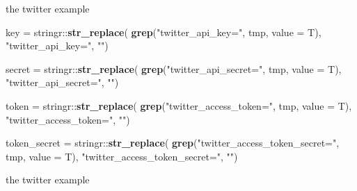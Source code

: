 \documentclass[ignorenonframetext,]{beamer}
\newenvironment{Shaded}{\begin{snugshade}}{\end{snugshade}}
\newcommand{\KeywordTok}[1]{\textcolor[rgb]{0.13,0.29,0.53}{\textbf{{#1}}}}
\newcommand{\DataTypeTok}[1]{\textcolor[rgb]{0.13,0.29,0.53}{{#1}}}
\newcommand{\FloatTok}[1]{\textcolor[rgb]{0.00,0.00,0.81}{{#1}}}
\newcommand{\StringTok}[1]{\textcolor[rgb]{0.31,0.60,0.02}{{#1}}}
\newcommand{\OtherTok}[1]{\textcolor[rgb]{0.56,0.35,0.01}{{#1}}}
\newcommand{\NormalTok}[1]{{#1}}
\begin{document}
\begin{frame}[fragile]{the twitter example}

\begin{Shaded}
\begin{Highlighting}[]
\NormalTok{key =}\StringTok{ }\NormalTok{stringr::}\KeywordTok{str_replace}\NormalTok{(}
  \KeywordTok{grep}\NormalTok{(}\StringTok{"twitter_api_key="}\NormalTok{, tmp, }\DataTypeTok{value =} \NormalTok{T), }
  \StringTok{"twitter_api_key="}\NormalTok{, }\StringTok{""}\NormalTok{)}

\NormalTok{secret =}\StringTok{ }\NormalTok{stringr::}\KeywordTok{str_replace}\NormalTok{(}
  \KeywordTok{grep}\NormalTok{(}\StringTok{"twitter_api_secret="}\NormalTok{, tmp, }\DataTypeTok{value =} \NormalTok{T), }
  \StringTok{"twitter_api_secret="}\NormalTok{, }\StringTok{""}\NormalTok{)}

\NormalTok{token =}\StringTok{ }\NormalTok{stringr::}\KeywordTok{str_replace}\NormalTok{(}
  \KeywordTok{grep}\NormalTok{(}\StringTok{"twitter_access_token="}\NormalTok{, tmp, }\DataTypeTok{value =} \NormalTok{T), }
  \StringTok{"twitter_access_token="}\NormalTok{, }\StringTok{""}\NormalTok{)}

\NormalTok{token_secret =}\StringTok{ }\NormalTok{stringr::}\KeywordTok{str_replace}\NormalTok{(}
  \KeywordTok{grep}\NormalTok{(}\StringTok{"twitter_access_token_secret="}\NormalTok{, tmp, }\DataTypeTok{value =} \NormalTok{T), }
  \StringTok{"twitter_access_token_secret="}\NormalTok{, }\StringTok{""}\NormalTok{)}
\end{Highlighting}
\end{Shaded}

\end{frame}

\begin{frame}[fragile]{the twitter example}

\begin{Shaded}
\end{Shaded}

\end{frame}
\end{document}
